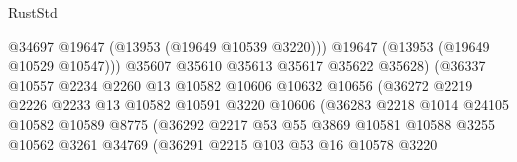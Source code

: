 \begin{lexlean}{RustStd}
\begin{coremodule}
                                          @34697
                                          @19647
                                          (@13953 (@19649 @10539 @3220)))
                                        @19647
                                        (@13953 (@19649 @10529 @10547)))
                                      @35607
                                      @35610
                                      @35613
                                      @35617
                                      @35622
                                      @35628)
                                    (@36337
                                      @10557
                                      @2234
                                      @2260
                                      @13
                                      @10582
                                      @10606
                                      @10632
                                      @10656
                                      (@36272
                                        @2219
                                        @2226
                                        @2233
                                        @13
                                        @10582
                                        @10591
                                        @3220
                                        @10606
                                        (@36283
                                          @2218
                                          @1014
                                          @24105
                                          @10582
                                          @10589
                                          @8775
                                          (@36292
                                            @2217
                                            @53
                                            @55
                                            @3869
                                            @10581
                                            @10588
                                            @3255
                                            @10562
                                            @3261
                                            @34769
                                            (@36291
                                              @2215
                                              @103
                                              @53
                                              @16
                                              @10578
                                              @3220

\end{coremodule}
\end{lexlean}
